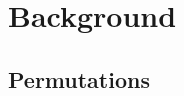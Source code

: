 \documentclass[runningheads]{llncs}
\begin{document}
%
%
%
%
%
%

\section{Background}\label{sec:backgroud}

\subsection{Permutations}
\end{document}
